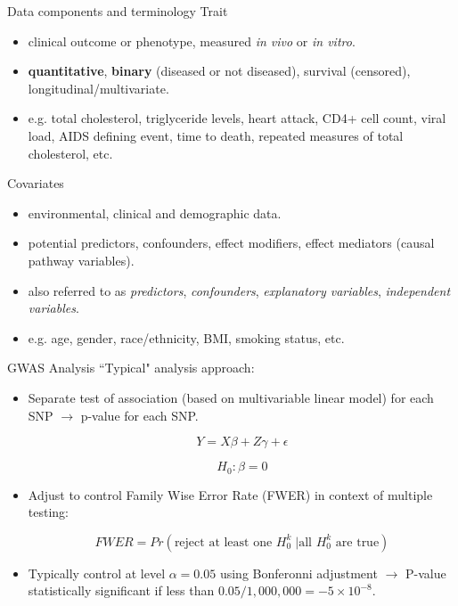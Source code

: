 \documentclass[table]{beamer}\usepackage[]{graphicx}\usepackage[]{color}
\begin{document}
\begin{frame}{Data components and terminology}
Trait
\begin{itemize}
\item clinical outcome or phenotype, measured \emph{in vivo} or \emph{in vitro}.
\item {\bf quantitative}, {\bf binary} (diseased or not diseased), survival (censored), longitudinal/multivariate.
\item e.g. total cholesterol, triglyceride levels, heart attack, CD4+ cell count, viral load, AIDS defining event, time to death, repeated measures of total cholesterol, etc.
\end{itemize}
Covariates
\begin{itemize}
\item environmental, clinical and demographic data.
\item potential predictors, confounders, effect modifiers, effect mediators (causal pathway variables).
\item also referred to as \emph{predictors}, \emph{confounders}, \emph{explanatory variables}, \emph{independent variables}.
\item e.g. age, gender, race/ethnicity, BMI, smoking status, etc.
\end{itemize}
\end{frame}


\begin{frame}{GWAS Analysis}
``Typical" analysis approach:
\begin{itemize}
\item Separate test of association (based on multivariable linear model) for each SNP $\rightarrow$ p-value for each SNP.

\begin{equation*}
Y=X\beta + Z \gamma + \epsilon
\end{equation*}

\begin{equation*}
H_0: \beta=0
\end{equation*}

\item Adjust to control Family Wise Error Rate (FWER) in context of multiple testing: 

\begin{equation*}
FWER=Pr(\text{reject at least one }H_0^k \; | \text{all } H_0^k \text{ are true})
\end{equation*}

\item Typically control at level $\alpha=0.05$ using Bonferonni adjustment $\rightarrow$ P-value statistically significant if less than $0.05/1,000,000=-5 \times 10^{-8}$.
\end{itemize}
\end{frame}
\end{document}
